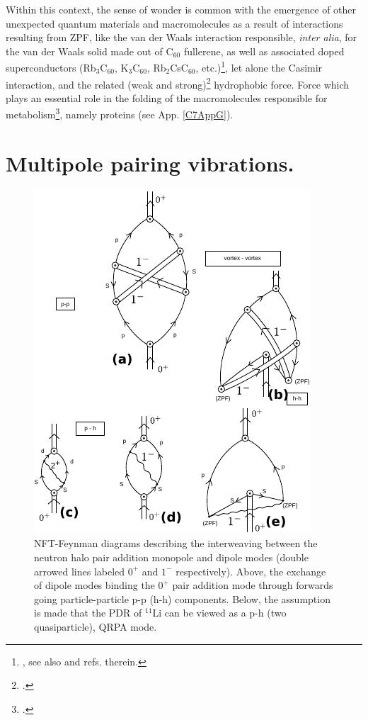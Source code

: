 \begin{subappendices}
 Within this context, the sense of wonder is common with the emergence of other unexpected quantum materials and macromolecules as a result of interactions resulting from ZPF, like the van der Waals interaction responsible, \textit{inter alia}, for the van der Waals solid made out of C$_{60}$ fullerene, as well as associated doped superconductors (Rb$_3$C$_{60}$, K$_3$C$_{60}$, Rb$_2$CsC$_{60}$, etc.)\footnote{\cite{Hebard:91,Rosseinsky:91,Holczer:91,Fleming:91,Anderson:91,Zhou:92,Hebard:92,Gunnarsson:95,Gunnarsson:97,Gunnarsson:04}, see also \cite{Broglia:04b} and refs. therein.}, let alone the Casimir interaction, and the related (weak and strong)\footnote{\cite{Chandler:02}.} hydrophobic force. Force which plays an essential role in the folding of the macromolecules responsible for metabolism\footnote{\cite{Dyson:99}.}, namely proteins (see App. \ref{C7AppG}).




\section{Multipole pairing vibrations.}\label{App6G}
\begin{figure}
\includegraphics[width=\textwidth]{C8/figsC8/figA1_corr.pdf}
\caption{ NFT-Feynman diagrams describing the interweaving between the neutron halo pair addition monopole and dipole modes
(double arrowed lines labeled $0^+$ and $1^-$ respectively). Above, the exchange of dipole modes binding the $0^+$ pair addition mode through  forwards going particle-particle p-p (h-h) components. Below,  the assumption is made that the PDR of $^{11}$Li can be viewed as a p-h (two quasiparticle), QRPA mode.}\label{fig6.I.1}
\end{figure}


\end{subappendices}
